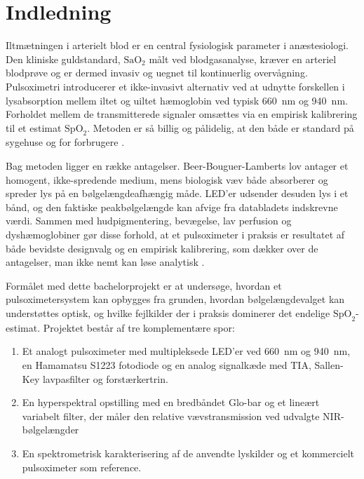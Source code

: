 \chapter{Indledning}

Iltmætningen i arterielt blod er en central fysiologisk parameter i anæstesiologi. Den kliniske guldstandard, $\text{SaO}_2$ målt ved blodgasanalyse, kræver en arteriel blodprøve og er dermed invasiv og uegnet til kontinuerlig overvågning. Pulsoximetri introducerer et ikke-invasivt alternativ ved at udnytte forskellen i lysabsorption mellem iltet og uiltet hæmoglobin ved typisk \SI{660}{nm} og \SI{940}{nm}. Forholdet mellem de transmitterede signaler omsættes via en empirisk kalibrering til et estimat $\text{SpO}_2$. Metoden er så billig og pålidelig, at den både er standard på sygehuse og for forbrugere \cite{Webster1997,Nitzan2014}.

Bag metoden ligger en række antagelser. Beer-Bouguer-Lamberts lov antager et homogent, ikke-spredende medium, mens biologisk væv både absorberer og spreder lys på en bølgelængdeafhængig måde. LED'er udsender desuden lys i et bånd, og den faktiske peakbølgelængde kan afvige fra databladets indskrevne værdi. Sammen med hudpigmentering, bevægelse, lav perfusion og dyshæmoglobiner gør disse forhold, at et pulsoximeter i praksis er resultatet af både bevidste designvalg og en empirisk kalibrering, som dækker over de antagelser, man ikke nemt kan løse analytisk \cite{Tuchin2015,Ruberry2025}.

Formålet med dette bachelorprojekt er at undersøge, hvordan et pulsoximetersystem kan opbygges fra grunden, hvordan bølgelængdevalget kan understøttes optisk, og hvilke fejlkilder der i praksis dominerer det endelige $\text{SpO}_2$-estimat. Projektet består af tre komplementære spor: 

\begin{enumerate}
    \item Et analogt pulsoximeter med multipleksede LED'er ved \SI{660}{nm} og \SI{940}{nm}, en Hamamatsu S1223 fotodiode og en analog signalkæde med TIA, Sallen-Key lavpasfilter og forstærkertrin.

    \item En hyperspektral opstilling med en bredbåndet Glo-bar og et lineært variabelt filter, der måler den relative vævstransmission ved udvalgte NIR-bølgelængder

    \item En spektrometrisk karakterisering af de anvendte lyskilder og et kommercielt pulsoximeter som reference.
\end{enumerate}